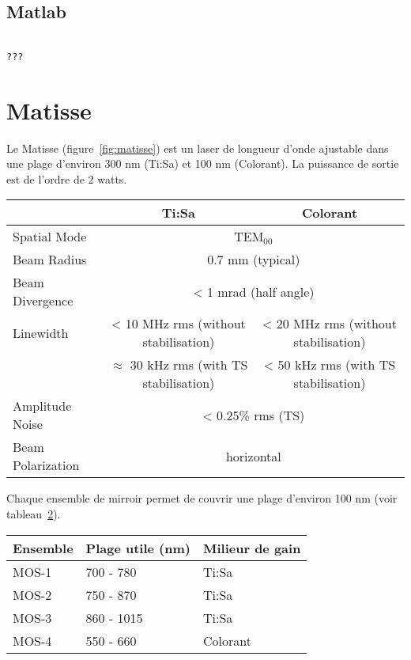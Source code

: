 \documentclass[11pt,francais]{book} %
\begin{document}
\subsection{Matlab}

\begin{lstlisting}[frame=single,caption={Exemple d'utilisation du lockin Surich Instruments avec Matlab},label={lst:exlockinzi},breaklines=true,]  % Start your code-block
  
???
\end{lstlisting}


\section{Matisse}

Le Matisse (figure~\ref{fig:matisse}) est un laser de longueur d'onde ajustable dans une plage d'environ 300 nm (Ti:Sa) et 100 nm (Colorant).
La puissance de sortie est de l'ordre de 2 watts.

\begin{table}[htbp]
  \centering
  \begin{tabular}{lcc}
                    & Ti:Sa       & Colorant \\
    \hline
    Spatial Mode    &	\multicolumn{2}{c}{TEM$_{00}$} \\
    Beam Radius     &  \multicolumn{2}{c}{0.7 mm (typical)}  \\
    Beam Divergence & 	\multicolumn{2}{c}{< 1 mrad (half angle)} \\
    Linewidth       & 	< 10 MHz rms (without stabilisation) & < 20 MHz rms (without stabilisation)\\
    & 	$\approx$ 30 kHz rms (with TS stabilisation) & 	< 50 kHz rms (with TS stabilisation) \\
    Amplitude Noise &  	\multicolumn{2}{c}{< 0.25\% rms (TS)}\\
    Beam Polarization & 	\multicolumn{2}{c}{horizontal} \\
  \end{tabular}
  \label{tab:matisseGeneralCharacteristics}
\end{table}


Chaque ensemble de mirroir permet de couvrir une plage d'environ 100 nm (voir tableau~\ref{tab:setMiroirsMatisse}).

\begin{table}[htbp]
  \centering
  \begin{tabular}{lll}
    Ensemble & Plage utile (nm) & Milieur de gain\\
    \hline
    MOS-1    & 700 - 780        & Ti:Sa\\
    MOS-2    & 750 - 870        & Ti:Sa\\
    MOS-3    & 860 - 1015       & Ti:Sa\\
    MOS-4    & 550 - 660        & Colorant\\
  \end{tabular}
  \label{tab:setMiroirsMatisse}
\end{table}
\end{document}
